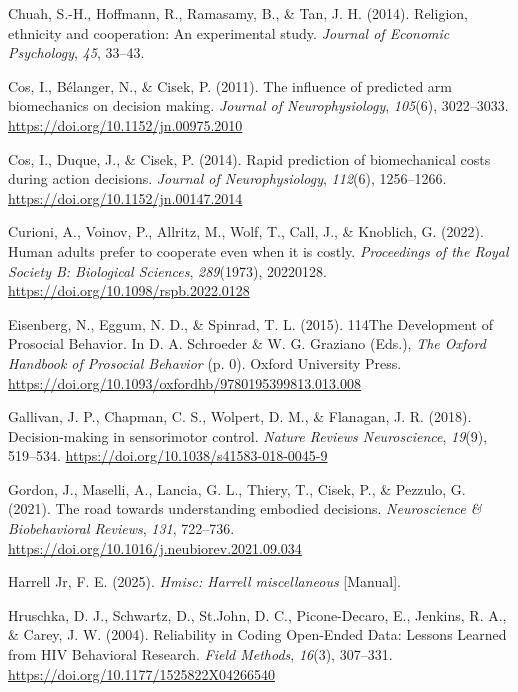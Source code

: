 \documentclass[
  11pt,
  letterpaper,
]{article}
\newlength{\cslhangindent}
\newenvironment{CSLReferences}[2] %
 {\begin{list}{}{%
  \setlength{\itemindent}{0pt}
  \setlength{\leftmargin}{0pt}
  \setlength{\parsep}{0pt}
  \ifodd #1
   \setlength{\leftmargin}{\cslhangindent}
   \setlength{\itemindent}{-1\cslhangindent}
  \fi
  \setlength{\itemsep}{#2\baselineskip}}}
 {\end{list}}
\renewcommand{\emph}[1]{\textit{#1}}  %
\begin{document}
\begin{CSLReferences}{1}{0}
Chuah, S.-H., Hoffmann, R., Ramasamy, B., \& Tan, J. H. (2014).
Religion, ethnicity and cooperation: {An} experimental study.
\emph{Journal of Economic Psychology}, \emph{45}, 33--43.

Cos, I., Bélanger, N., \& Cisek, P. (2011). The influence of predicted
arm biomechanics on decision making. \emph{Journal of Neurophysiology},
\emph{105}(6), 3022--3033. \url{https://doi.org/10.1152/jn.00975.2010}

Cos, I., Duque, J., \& Cisek, P. (2014). Rapid prediction of
biomechanical costs during action decisions. \emph{Journal of
Neurophysiology}, \emph{112}(6), 1256--1266.
\url{https://doi.org/10.1152/jn.00147.2014}

Curioni, A., Voinov, P., Allritz, M., Wolf, T., Call, J., \& Knoblich,
G. (2022). Human adults prefer to cooperate even when it is costly.
\emph{Proceedings of the Royal Society B: Biological Sciences},
\emph{289}(1973), 20220128. \url{https://doi.org/10.1098/rspb.2022.0128}

Eisenberg, N., Eggum, N. D., \& Spinrad, T. L. (2015). {114The
Development} of {Prosocial Behavior}. In D. A. Schroeder \& W. G.
Graziano (Eds.), \emph{The {Oxford Handbook} of {Prosocial Behavior}}
(p. 0). Oxford University Press.
\url{https://doi.org/10.1093/oxfordhb/9780195399813.013.008}

Gallivan, J. P., Chapman, C. S., Wolpert, D. M., \& Flanagan, J. R.
(2018). Decision-making in sensorimotor control. \emph{Nature Reviews
Neuroscience}, \emph{19}(9), 519--534.
\url{https://doi.org/10.1038/s41583-018-0045-9}

Gordon, J., Maselli, A., Lancia, G. L., Thiery, T., Cisek, P., \&
Pezzulo, G. (2021). The road towards understanding embodied decisions.
\emph{Neuroscience \& Biobehavioral Reviews}, \emph{131}, 722--736.
\url{https://doi.org/10.1016/j.neubiorev.2021.09.034}

Harrell Jr, F. E. (2025). \emph{Hmisc: {Harrell} miscellaneous}
{[}Manual{]}.

Hruschka, D. J., Schwartz, D., St.John, D. C., Picone-Decaro, E.,
Jenkins, R. A., \& Carey, J. W. (2004). Reliability in {Coding
Open-Ended Data}: {Lessons Learned} from {HIV Behavioral Research}.
\emph{Field Methods}, \emph{16}(3), 307--331.
\url{https://doi.org/10.1177/1525822X04266540}


\end{CSLReferences}
\end{document}
